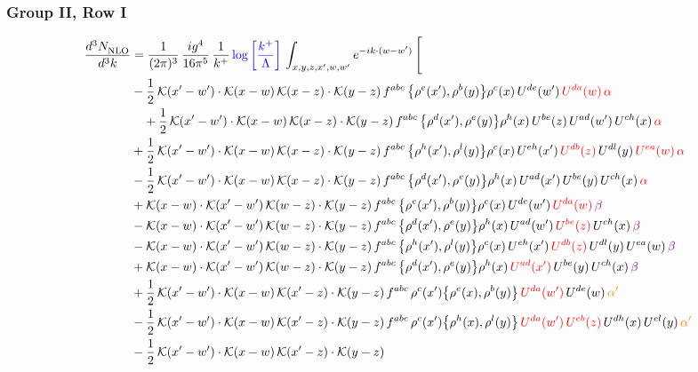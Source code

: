 \documentclass[9pt]{article}
\numberwithin{equation}{section}
\begin{document}
\subsubsection{Group II, Row I}
\begin{align}
     \frac{d^{3}N_{\rm NLO}^{\rm}}{d^{3}k}  & = \frac{1}{(2\pi)^{3}}\, \frac{ig^{4}}{16\pi^{5}}\, \frac{1}{k^{+}}\, {\color{blue}\log{\left[\frac{k^{+}}{\Lambda}\right]}}\, \int_{x,y,z,x^{\prime},w,w^{\prime}}e^{-ik\cdot (w-w')}\, \Bigg[\notag \\ & -\frac{1}{2}\,\mathcal{K}(x'-w')\cdot\mathcal{K}(x-w)\,\mathcal{K}(x-z)\cdot\mathcal{K}(y-z)\, f^{abc}\,\big\{\rho^{e}(x'),\rho^{b}(y)\big\}\rho^{c}(x)\,U^{de}(w')\,{\color{red}U^{da}(w)}\,{\color{red}\alpha}\notag \\ &\quad+\frac{1}{2}\,\mathcal{K}(x'-w')\cdot\mathcal{K}(x-w)\,\mathcal{K}(x-z)\cdot\mathcal{K}(y-z)\, f^{abc}\,\big\{\rho^{d}(x'),\rho^{e}(y)\big\}\rho^{h}(x)\,U^{be}(z)\,U^{ad}(w')\,U^{ch}(x)\,{\color{red}\alpha}\notag\\ & +\frac{1}{2}\,\mathcal{K}(x'-w')\cdot\mathcal{K}(x-w)\,\mathcal{K}(x-z)\cdot\mathcal{K}(y-z)\, f^{abc}\,\big\{\rho^{h}(x'),\rho^{l}(y)\big\}\rho^{c}(x)\,U^{eh}(x')\,{\color{red}U^{db}(z)}\,U^{dl}(y)\,{\color{red}U^{ea}(w)}\,{\color{red}\alpha}\notag \\ &-\frac{1}{2}\,\mathcal{K}(x'-w')\cdot\mathcal{K}(x-w)\,\mathcal{K}(x-z)\cdot\mathcal{K}(y-z)\, f^{abc}\,\big\{\rho^{d}(x'),\rho^{e}(y)\big\}\rho^{h}(x)\,U^{ad}(x')\,U^{be}(y)\,U^{ch}(x)\,{\color{red}\alpha}\notag\\ &+\mathcal{K}(x-w)\cdot\mathcal{K}(x'-w')\,\mathcal{K}(w-z)\cdot\mathcal{K}(y-z)\, f^{abc}\,\big\{\rho^{e}(x'),\rho^{b}(y)\big\}\rho^{c}(x)\,U^{de}(w')\,{\color{red}U^{da}(w)}\,{\color{violet}\beta}\notag\\ &-\mathcal{K}(x-w)\cdot\mathcal{K}(x'-w')\,\mathcal{K}(w-z)\cdot\mathcal{K}(y-z)\, f^{abc}\,\big\{\rho^{d}(x'),\rho^{e}(y)\big\}\rho^{h}(x)\,U^{ad}(w')\,{\color{red}U^{be}(z)}\,U^{ch}(x)\,{\color{violet}\beta}\notag \\ &-\mathcal{K}(x-w)\cdot\mathcal{K}(x'-w')\,\mathcal{K}(w-z)\cdot\mathcal{K}(y-z)\, f^{abc}\,\big\{\rho^{h}(x'),\rho^{l}(y)\big\}\rho^{c}(x)\,U^{eh}(x')\,{\color{red}U^{db}(z)}\,U^{dl}(y)\,U^{ea}(w)\,{\color{violet}\beta}\notag \\ & +\mathcal{K}(x-w)\cdot\mathcal{K}(x'-w')\,\mathcal{K}(w-z)\cdot\mathcal{K}(y-z)\, f^{abc}\,\big\{\rho^{d}(x'),\rho^{e}(y)\big\}\rho^{h}(x)\,{\color{red}U^{ad}(x')}\,U^{be}(y)\,U^{ch}(x)\,{\color{violet}\beta}\notag \\ &+\frac{1}{2}\,\mathcal{K}(x'-w')\cdot\mathcal{K}(x-w)\,\mathcal{K}(x'-z)\cdot\mathcal{K}(y-z)\, f^{abc}\,\rho^{c}(x')\big\{\rho^{e}(x),\rho^{b}(y)\big\}\,{\color{red}U^{da}(w')}\,U^{de}(w)\,{\color{orange}\alpha'}\notag \\ &-\frac{1}{2}\,\mathcal{K}(x'-w')\cdot\mathcal{K}(x-w)\,\mathcal{K}(x'-z)\cdot\mathcal{K}(y-z)\, f^{abc}\,\rho^{c}(x')\big\{\rho^{h}(x),\rho^{l}(y)\big\}\,{\color{red}U^{da}(w')}\,{\color{red}U^{eb}(z)}\,U^{dh}(x)\,U^{el}(y)\,{\color{orange}\alpha'}\notag \\ &-\frac{1}{2}\,\mathcal{K}(x'-w')\cdot\mathcal{K}(x-w)\,\mathcal{K}(x'-z)\cdot\mathcal{K}(y-z)\, 
\end{align}
\end{document}
